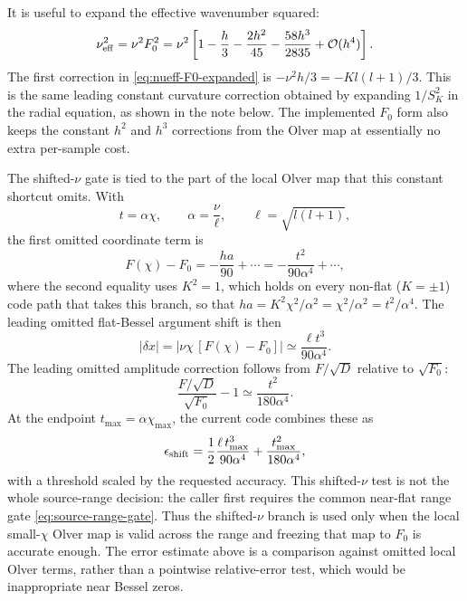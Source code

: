 \documentclass[11pt,a4paper]{article}
\newcommand{\SK}{S_K}
\newcommand{\abs}[1]{\left|#1\right|}
\newcommand{\order}{\mathcal{O}}
\begin{document}
It is useful to expand the effective wavenumber squared:
\begin{equation}
  \nu_{\rm eff}^2
  =\nu^2F_0^2
  =\nu^2\left[
  1-\frac{h}{3}-\frac{2h^2}{45}-\frac{58h^3}{2835}
  +\order(h^4)\right].
  \label{eq:nueff-F0-expanded}
\end{equation}
The first correction in \eqref{eq:nueff-F0-expanded} is
\(-\nu^2 h/3=-K l(l+1)/3\).  This is the same leading constant curvature
correction obtained by expanding \(1/\SK^2\) in the radial equation, as shown in
the note below.  The implemented \(F_0\) form also keeps the constant \(h^2\)
and \(h^3\) corrections from the Olver map at essentially no extra per-sample
cost.

The shifted-\(\nu\) gate is tied to the part of the local Olver map that this
constant shortcut omits.  With
\begin{equation}
  t=\alpha\chi,\qquad \alpha=\frac{\nu}{\ell},\qquad \ell=\sqrt{l(l+1)},
\end{equation}
the first omitted coordinate term is
\begin{equation}
  F(\chi)-F_0=-\frac{ha}{90}+\cdots
  =-\frac{t^2}{90\alpha^4}+\cdots,
\end{equation}
where the second equality uses \(K^2=1\), which holds on every non-flat
(\(K=\pm1\)) code path that takes this branch, so that
\(ha=K^2\chi^2/\alpha^2=\chi^2/\alpha^2=t^2/\alpha^4\).  The leading omitted
flat-Bessel argument shift is then
\begin{equation}
  \abs{\delta x}
  =\abs{\nu\chi\,[F(\chi)-F_0]}
  \simeq \frac{\ell t^3}{90\alpha^4}.
\end{equation}
The leading omitted amplitude correction follows from
\(F/\sqrt{D}\) relative to \(\sqrt{F_0}\):
\begin{equation}
  \frac{F/\sqrt D}{\sqrt{F_0}}-1
  \simeq \frac{t^2}{180\alpha^4}.
\end{equation}
At the endpoint \(t_{\max}=\alpha\chi_{\max}\), the current code combines these
as
\begin{equation}
  \epsilon_{\rm shift}=
  \frac{1}{2}\frac{\ell\,t_{\max}^3}{90\alpha^4}
  +\frac{t_{\max}^2}{180\alpha^4},
  \label{eq:shift-error}
\end{equation}
with a threshold scaled by the requested accuracy.  This shifted-\(\nu\) test is
not the whole source-range decision: the caller first requires the common
near-flat range gate \eqref{eq:source-range-gate}.  Thus the shifted-\(\nu\)
branch is used only when the local small-\(\chi\) Olver map is valid across the
range and freezing that map to \(F_0\) is accurate enough.  The error estimate
above is a comparison against omitted local Olver terms, rather than a
pointwise relative-error test, which would be inappropriate near Bessel zeros.
\end{document}
